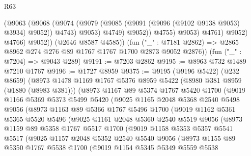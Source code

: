 \begin{lexlean}{R63}
\begin{coremodule}
                        (@9063
                          (@9068
                            (@9074
                              (@9079 (@9085 (@9091 (@9096 (@9102 @9138 @9053) @3934) @9052)) @4743)
                              @9053)
                            @4749)
                          @9052))
                      @4755)
                    @9053)
                  @4761)
                @9052)
              @4766)
            @9052))
        (@2646 @8587 @4585))
      (fun ("_" : @7181 @2862) => @2865 @8962 @274 @276 @89 @1767 @1767 @1700 @2873 @9052 @2876))
    (fun ("_" : @7204) => @9043 @289)
@9191 := @7203 @2862
@9195 := @8963 @732 @1489 @7210 @1767
@9196 := @1727 @8959
@9375 := @9195
    (@9196 @5422)
    (@232 @8659)
    (@8973
      @1478
      @1169
      @1767
      @5376
      @8959
      @5422
      (@8980 @381 @8959 (@1880 (@8983 @381)))
      (@8973
        @1167
        @89
        @5374
        @1767
        @5420
        @1700
        (@9019
          @1166
          @5369
          @5373
          @5499
          @5420
          (@9025
            @1165
            @2048
            @5368
            @2540
            @5498
            @9056
            (@8973
              @1163
              @89
              @5366
              @1767
              @5496
              @1700
              (@9019
                @1162
                @5361
                @5365
                @5520
                @5496
                (@9025
                  @1161
                  @2048
                  @5360
                  @2540
                  @5519
                  @9056
                  (@8973
                    @1159
                    @89
                    @5358
                    @1767
                    @5517
                    @1700
                    (@9019
                      @1158
                      @5353
                      @5357
                      @5541
                      @5517
                      (@9025
                        @1157
                        @2048
                        @5352
                        @2540
                        @5540
                        @9056
                        (@8973
                          @1155
                          @89
                          @5350
                          @1767
                          @5538
                          @1700
                          (@9019
                            @1154
                            @5345
                            @5349
                            @5559
                            @5538

\end{coremodule}
\end{lexlean}
